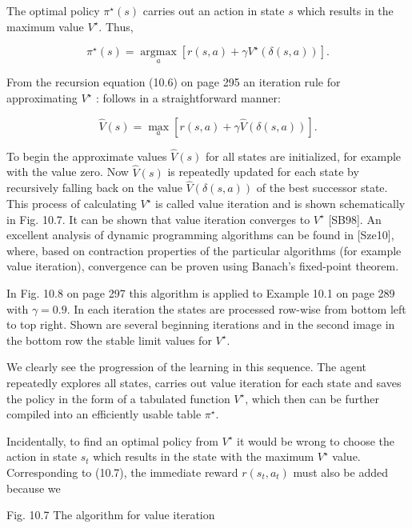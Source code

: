 \documentclass[10pt]{article}
\begin{document}
The optimal policy $\pi^{\star}(s)$ carries out an action in state $s$ which results in the maximum value $V^{\star}$. Thus,


\begin{equation*}
\pi^{\star}(s)=\underset{a}{\operatorname{argmax}}\left[r(s, a)+\gamma V^{\star}(\delta(s, a))\right] . \tag{10.7}
\end{equation*}


From the recursion equation (10.6) on page 295 an iteration rule for approximating $V^{\star}$ : follows in a straightforward manner:


\begin{equation*}
\hat{V}(s)=\max _{a}[r(s, a)+\gamma \hat{V}(\delta(s, a))] . \tag{10.8}
\end{equation*}


To begin the approximate values $\hat{V}(s)$ for all states are initialized, for example with the value zero. Now $\hat{V}(s)$ is repeatedly updated for each state by recursively falling back on the value $\hat{V}(\delta(s, a))$ of the best successor state. This process of calculating $V^{\star}$ is called value iteration and is shown schematically in Fig. 10.7. It can be shown that value iteration converges to $V^{\star}$ [SB98]. An excellent analysis of dynamic programming algorithms can be found in [Sze10], where, based on contraction properties of the particular algorithms (for example value iteration), convergence can be proven using Banach's fixed-point theorem.

In Fig. 10.8 on page 297 this algorithm is applied to Example 10.1 on page 289 with $\gamma=0.9$. In each iteration the states are processed row-wise from bottom left to top right. Shown are several beginning iterations and in the second image in the bottom row the stable limit values for $V^{\star}$.

We clearly see the progression of the learning in this sequence. The agent repeatedly explores all states, carries out value iteration for each state and saves the policy in the form of a tabulated function $V^{\star}$, which then can be further compiled into an efficiently usable table $\pi^{\star}$.

Incidentally, to find an optimal policy from $V^{\star}$ it would be wrong to choose the action in state $s_{t}$ which results in the state with the maximum $V^{\star}$ value. Corresponding to (10.7), the immediate reward $r\left(s_{t}, a_{t}\right)$ must also be added because we

Fig. 10.7 The algorithm for value iteration
\end{document}
